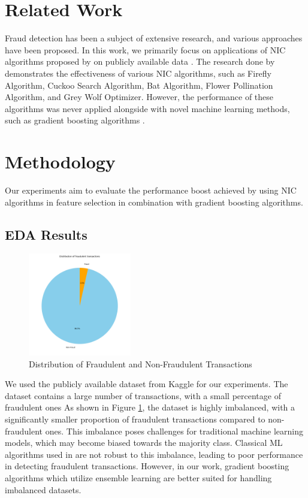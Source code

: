 \documentclass[conference]{IEEEtran}
\begin{document}
\section{Related Work}
Fraud detection has been a subject of extensive research,
and various approaches have been proposed. In this
work, we primarily focus on applications of NIC algorithms
proposed by \cite{github} on publicly available data \cite{dataset}.
The research done by \cite{github}
demonstrates the effectiveness of various NIC algorithms, such as
Firefly Algorithm, Cuckoo Search Algorithm, Bat Algorithm,
Flower Pollination Algorithm, and Grey Wolf Optimizer. However,
the performance of these algorithms was never applied alongside
with novel machine learning methods, such as gradient boosting
algorithms \cite{xgboost, catboost, lightgbm}.

\section{Methodology}
Our experiments aim to evaluate the performance boost achieved
by using NIC algorithms in feature selection in combination with
gradient boosting algorithms.

\subsection{EDA Results}

\begin{figure}[H]
	\centering
	\includegraphics[width=0.4\textwidth]{fraud_pie.png}
	\caption{Distribution of Fraudulent and Non-Fraudulent Transactions}
	\label{fig:fraud_pie}
\end{figure}

We used the publicly available dataset from Kaggle \cite{dataset}
for our experiments. The dataset contains a large number of
transactions, with a small percentage of fraudulent ones
As shown in Figure \ref{fig:fraud_pie}, the dataset is highly
imbalanced, with a significantly smaller proportion of fraudulent
transactions compared to non-fraudulent ones.
This imbalance poses challenges for traditional machine
learning models, which may become biased towards the majority class.
Classical ML algorithms used in \cite{github} are not robust
to this imbalance, leading to poor performance in detecting
fraudulent transactions. However, in our work,
gradient boosting algorithms which utilize ensemble learning
are better suited for handling imbalanced datasets.
\end{document}

